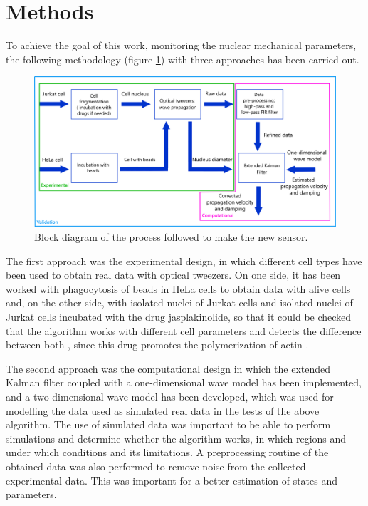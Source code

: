 \documentclass[12pt, a4paper]{article} %
\begin{document}
	\setlength{\parskip}{4mm}
	
	\newpage
	\setlength{\parskip}{0mm}
	
	\section{Methods}
	
	To achieve the goal of this work, monitoring the nuclear mechanical parameters, the following methodology (figure \ref{fig:esquema_trabajo}) with three approaches has been carried out.
	
	\setlength{\parskip}{4mm}
	
	\begin{figure}[htbp]
		\centering
		\includegraphics[width=1\textwidth]{figures/esquema_trabajo_metodos_2.png}
		\caption{Block diagram of the process followed to make the new sensor.}
		\label{fig:esquema_trabajo}
	\end{figure}
	
	The first approach was the experimental design, in which different cell types have been used to obtain real data with optical tweezers. On one side, it has been worked with phagocytosis of beads in HeLa cells \cite{gey1952tissue} to obtain data with alive cells and, on the other side, with isolated nuclei of Jurkat cells \cite{schneider1977characterization, gioia2018genome} and isolated nuclei of Jurkat cells incubated with the drug jasplakinolide, so that it could be checked that the algorithm works with different cell parameters and detects the difference between both \cite{andersen2002directed}, since this drug promotes the polymerization of actin \cite{holzinger2001jasplakinolide}.
	
	The second approach was the computational design in which the extended Kalman filter coupled with a one-dimensional wave model has been implemented, and a two-dimensional wave model has been developed, which was used for modelling the data used as simulated real data in the tests of the above algorithm.  The use of simulated data was important to be able to perform simulations and determine whether the algorithm works, in which regions and under which conditions and its limitations. A preprocessing routine of the obtained data was also performed to remove noise from the collected experimental data. This was important for a better estimation of states and parameters.
	
\end{document}
